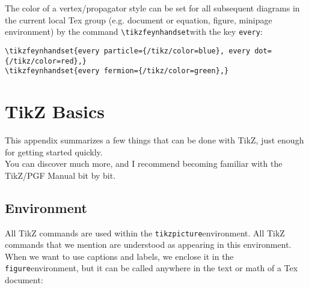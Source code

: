 \documentclass[10pt,letterpaper,twoside,notitlepage]{article}
\numberwithin{figure}{section}
\begin{document}
% 
\setlength{\feynhanddotsize}{1.5mm}
\setlength{\feynhandblobsize}{7.5mm}
\setlength{\feynhandlinesize}{0.5pt}
\setlength{\feynhandarrowsize}{6pt}
\setlength{\feynhandtopsep}{18\feynhandlinesize}
\renewcommand{\feynhandtopsepcolor}{white}
%
The color of a vertex/propagator style can be set for all subsequent diagrams
in the current local Tex group (e.g. document or equation, figure, minipage environment) 
by the command \vercol\verb$\tikzfeynhandset$\txcol with the key \vercol\verb$every$\txcol:
%
\vercol\begin{verbatim}
\tikzfeynhandset{every particle={/tikz/color=blue}, every dot={/tikz/color=red},}
\tikzfeynhandset{every fermion={/tikz/color=green},}
\end{verbatim}\txcol

%
%
\appendix
%	
\section{TikZ Basics}
\label{Apx_tikzbasics}
%
This appendix summarizes a few things that can be done with TikZ,
just enough for getting started quickly.\\
You can discover much more, and I recommend
becoming familiar with the TikZ/PGF Manual \cite{tikz} bit by bit.

\subsection{Environment}
\label{Apx_tikzbasics_environment}
%
\noindent
All TikZ commands are used within the 
\brocol\verb$tikzpicture$\txcol environment.
All TikZ commands that we mention are understood 
as appearing in this environment.
When we want to use captions and labels, we enclose it in the 
\brocol\verb$figure$\txcol environment, but it can be called 
anywhere in the text or math of a Tex document:\\
\end{document}
